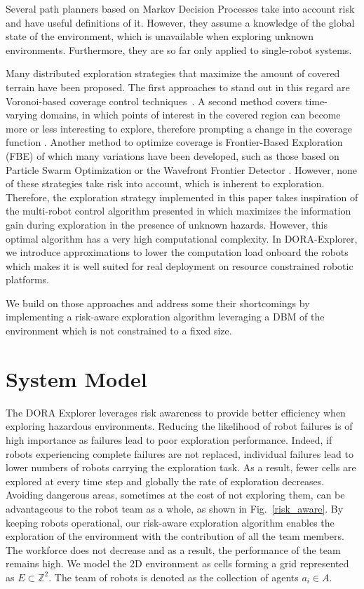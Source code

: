 \documentclass[letterpaper, 10 pt, conference]{ieeeconf}
\begin{document}
Several path planners based on Markov Decision Processes
\cite{undurti2010online,thiebaux2016rao,xiao2020robot} take into
account risk and have useful definitions of it. However, they assume a
knowledge of the global state of the environment, which is unavailable
when exploring unknown environments. Furthermore, they are so far only
applied to single-robot systems.

Many distributed exploration strategies that maximize the amount of
covered terrain have been proposed. The first approaches to stand out
in this regard are Voronoi-based coverage control
techniques~\cite{luo2019voronoi,santos2019decentralized}. A second
method covers time-varying domains, in which points of interest in the
covered region can become more or less interesting to explore,
therefore prompting a change in the coverage function
\cite{santos2019decentralized,xu2019multi}. Another method to optimize
coverage is Frontier-Based Exploration (FBE)
\cite{yamauchi1998frontier} of which many variations have been
developed, such as those based on Particle Swarm Optimization
\cite{wang2011frontier} or the Wavefront Frontier Detector
\cite{topiwala2018frontier}. However, none of these strategies take
risk into account, which is inherent to exploration.  Therefore, the
exploration strategy implemented in this paper takes inspiration of
the multi-robot control algorithm presented in
\cite{dames2012decentralized,schwagerMultirobotControlPolicy2017}
which maximizes the information gain during exploration in the
presence of unknown hazards. However, this optimal algorithm has a
very high computational complexity. In DORA-Explorer, we introduce
approximations to lower the computation load onboard the robots which
makes it is well suited for real deployment on resource constrained
robotic platforms.

We build on those approaches and address some their shortcomings by
implementing a risk-aware exploration algorithm leveraging a DBM of
the environment which is not constrained to a fixed size.


\section{System Model}
The DORA Explorer leverages risk awareness to provide better
efficiency when exploring hazardous environments. Reducing the
likelihood of robot failures is of high importance as failures lead to
poor exploration performance. Indeed, if robots experiencing complete
failures are not replaced, individual failures lead to lower numbers
of robots carrying the exploration task. As a result, fewer cells are
explored at every time step and globally the rate of exploration
decreases. Avoiding dangerous areas, sometimes at the cost of not
exploring them, can be advantageous to the robot team as a whole, as
shown in Fig.~\ref{risk_aware}. By keeping robots operational, our
risk-aware exploration algorithm enables the exploration of the
environment with the contribution of all the team members. The
workforce does not decrease and as a result, the performance of the
team remains high. We model the 2D environment as cells forming a grid
represented as $E \subset \mathbb{Z}^2$. The team of robots is denoted
as the collection of agents $a_i \in A$.
\end{document}
